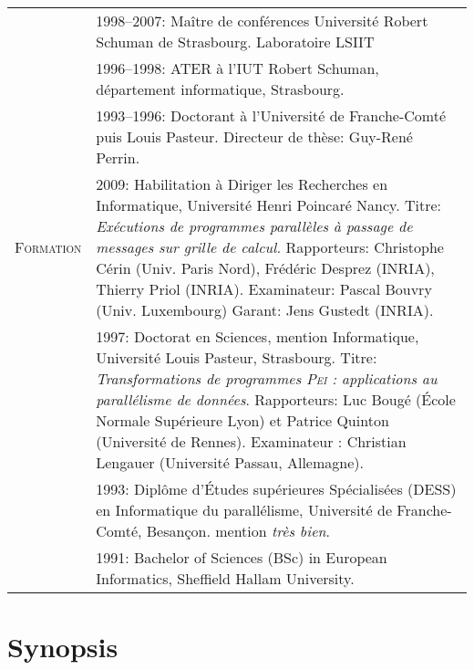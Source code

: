\begin{tabular}{lp{13.7cm}}
				& 1998--2007: Maître de conférences Université Robert Schuman de Strasbourg. Laboratoire LSIIT\\[2mm]
				& 1996--1998: ATER à l'IUT Robert Schuman, département informatique, Strasbourg.\\[2mm]
				& 1993--1996: Doctorant à l'Université de Franche-Comté puis Louis Pasteur. Directeur de thèse: Guy-René Perrin.\\[2mm]
\hline
\textsc{Formation}	& 2009:  Habilitation à Diriger les Recherches en Informatique, Université Henri Poincaré Nancy.
      			  Titre: {\em Exécutions de programmes parallèles à passage de messages sur grille de calcul.}
   				 Rapporteurs: 	Christophe Cérin (Univ. Paris Nord), 
				   		   	Frédéric Desprez (INRIA),
							Thierry Priol (INRIA). 
							Examinateur: Pascal Bouvry (Univ. Luxembourg)
							Garant: Jens Gustedt (INRIA).\\[5mm]
%
				& 1997:  Doctorat en Sciences, mention Informatique, Université Louis Pasteur, Strasbourg.
      			  Titre: {\em Transformations de programmes \textsc{Pei} : applications au parall\'{e}lisme de donn\'{e}es}.
		              Rapporteurs: Luc Bougé (\'{E}cole Normale Supérieure Lyon) et Patrice Quinton (Université de Rennes). Examinateur : Christian Lengauer (Université Passau, Allemagne).\\[2mm]
			      & 1993: Diplôme d'\'{E}tudes supérieures Spécialisées (DESS) en Informatique du parallélisme, 
				  Université de Franche-Comté, Besançon. mention {\em très bien}.\\[2mm]
				& 1991: Bachelor of Sciences (BSc) in European Informatics, Sheffield Hallam University.\\[5mm]

\end{tabular}




\section{Synopsis}

